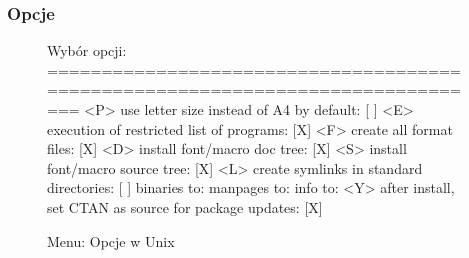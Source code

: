 \documentclass{article}
\begin{document}
\subsubsection{Opcje}
\label{sec:options}

\begin{figure}[tbh]
\begin{boxedverbatim}
Wybór opcji:
===============================================================================
 <P> use letter size instead of A4 by default: [ ]
 <E> execution of restricted list of programs: [X]
 <F> create all format files:                  [X]
 <D> install font/macro doc tree:              [X]
 <S> install font/macro source tree:           [X]
 <L> create symlinks in standard directories:  [ ]
            binaries to:
            manpages to:
                info to:
 <Y> after install, set CTAN as source for package updates: [X]
\end{boxedverbatim}
\caption{Menu: Opcje w Unix}\label{fig:options-text}
\end{figure}
\end{document}
